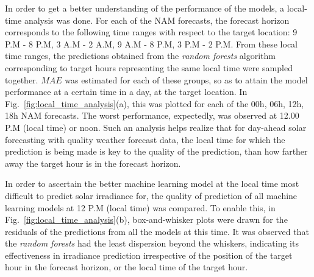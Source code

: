 \par In order to get a better understanding of the performance of the models, a local-time analysis was done. For each of the NAM forecasts, the forecast horizon corresponds to the following time ranges with respect to the target location: 9 P.M - 8 P.M, 3 A.M - 2 A.M, 9 A.M - 8 P.M, 3 P.M - 2 P.M. From these local time ranges, the predictions obtained from the \textit{random forests} algorithm corresponding to target hours representing the same local time were sampled together. $MAE$ was estimated for each of these groups, so as to attain the model performance at a certain time in a day, at the target location. In Fig.~\ref{fig:local_time_analysis}(a), this was plotted for each of the 00h, 06h, 12h, 18h NAM forecasts. The worst performance, expectedly, was observed at 12.00 P.M (local time) or noon. Such an analysis helps realize that for day-ahead solar forecasting with quality weather forecast data, the local time for which the prediction is being made is key to the quality of the prediction, than how farther away the target hour is in the forecast horizon.

\par In order to ascertain the better machine learning model at the local time most difficult to predict solar irradiance for, the quality of prediction of all machine learning models at 12 P.M (local time) was compared. To enable this, in Fig.~\ref{fig:local_time_analysis}(b), box-and-whisker plots were drawn for the residuals of the predictions from all the models at this time. It was observed that the \textit{random forests} had the least dispersion beyond the whiskers, indicating its effectiveness in irradiance prediction irrespective of the position of the target hour in the forecast horizon, or the local time of the target hour.

\newpage